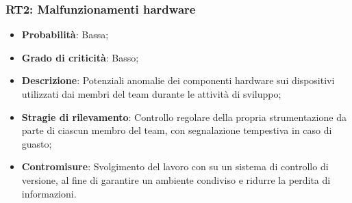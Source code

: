\subsubsection{RT2: Malfunzionamenti hardware}
\begin{itemize}
    \item \textbf{Probabilità}: Bassa;
    \item \textbf{Grado di criticità}: Basso;
    \item \textbf{Descrizione}: Potenziali anomalie dei componenti hardware sui dispositivi utilizzati dai membri del team durante le attività di sviluppo;
    \item \textbf{Stragie di rilevamento}: Controllo regolare della propria strumentazione da parte di ciascun membro del team, con segnalazione tempestiva in caso di guasto;
    \item \textbf{Contromisure}: Svolgimento del lavoro con  su un sistema di controllo di versione, al fine di garantire un ambiente condiviso e ridurre la perdita di informazioni.
\end{itemize}
